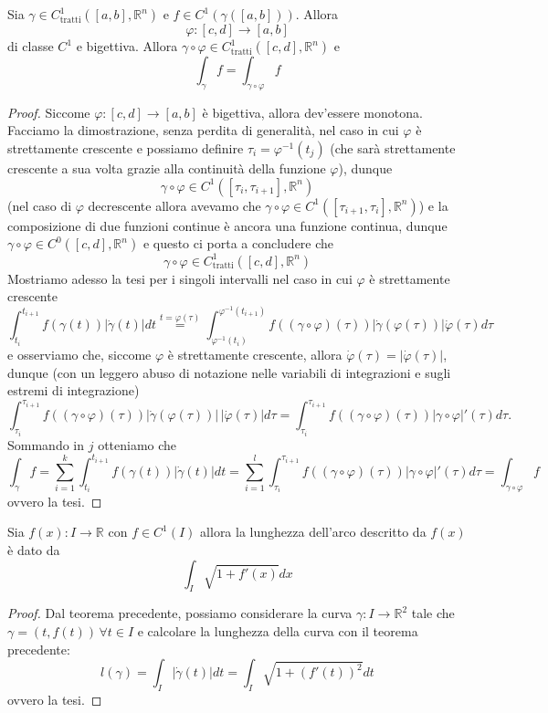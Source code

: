 \begin{theorem}
	Sia $\gamma \in C^1_{\text{tratti}}([a, b], \mathbb{R}^n)$ e $f \in C^1(\gamma([a, b]))$. Allora 
	$$
		\varphi: [c, d] \to [a, b]
	$$
	di classe $C^1$ e bigettiva. Allora $\gamma \circ \varphi \in C^1_{\text{tratti}}([c,d], \mathbb{R}^n)$ e
	$$
		\int_{\gamma} f = \int_{\gamma \circ \varphi} f
	$$
\end{theorem}
\begin{proof}
Siccome $\varphi: [c,d] \to [a,b]$ è bigettiva, allora dev'essere monotona. Facciamo la dimostrazione, senza perdita di generalità, nel caso in cui $\varphi$ è strettamente crescente
e possiamo definire $\tau_i = \varphi^{-1}(t_j)$ (che sarà strettamente crescente a sua volta grazie alla continuità della funzione $\varphi$), dunque
$$
\gamma \circ \varphi \in C^1([\tau_i, \tau_{i+1}], \mathbb{R}^n)
$$
(nel caso di $\varphi$ decrescente allora avevamo che $\gamma \circ \varphi \in C^1([\tau_{i+1}, \tau_{i}], \mathbb{R}^n)$) e la composizione di due funzioni continue è ancora una funzione continua, dunque
$\gamma \circ \varphi \in C^{0}([c, d], \mathbb{R}^n)$ e questo ci porta a concludere che
$$
\gamma \circ \varphi \in C^1_{\text{tratti}}([c, d], \mathbb{R}^n)
$$
Mostriamo adesso la tesi per i singoli intervalli nel caso in cui $\varphi$ è strettamente crescente
$$
\int_{t_i}^{t_{i+1}} f(\gamma(t))|\dot{\gamma}(t)|dt \stackrel{t = \varphi(\tau)}{=} \int_{\varphi^{-1}(t_{i})}^{\varphi^{-1}(t_{i+1})} f((\gamma \circ \varphi)(\tau))|\dot{\gamma}(\varphi(\tau))|\dot{\varphi}(\tau) d\tau
$$
\noindent e osserviamo che, siccome $\varphi$ è strettamente crescente, allora $\dot{\varphi}(\tau) = |\dot{\varphi}(\tau)|$, dunque (con un leggero abuso di notazione nelle variabili di integrazioni e sugli estremi di integrazione)
$$
\int_{\tau_i}^{\tau_{i+1}} f((\gamma \circ \varphi)(\tau))|\dot{\gamma}(\varphi(\tau))| \, |\dot{\varphi}(\tau)| d\tau = \int_{\tau_i}^{\tau_{i+1}} f( (\gamma \circ \varphi)(\tau) ) |\gamma \circ \varphi|'(\tau) d\tau.
$$
Sommando in $j$ otteniamo che
$$
\int_\gamma f = \sum_{i=1}^k \int_{t_i}^{t_{i+1}} f(\gamma(t))|\dot{\gamma}(t)|dt = \sum_{i=1}^l \int_{\tau_i}^{\tau_{i+1}} f((\gamma \circ \varphi)(\tau)) |\gamma \circ \varphi|'(\tau) d\tau = \int_{\gamma \circ \varphi} f 
$$
ovvero la tesi.
\end{proof}
\begin{cor}
	Sia $f(x): I \to \mathbb{R}$ con $f \in C^1(I)$ allora la lunghezza dell'arco descritto da $f(x)$ è dato da
	$$
		\int_I \sqrt{1 + f'(x)}dx
	$$
\end{cor}
\begin{proof}
Dal teorema precedente, possiamo considerare la curva $\gamma: I \to \mathbb{R}^2$ tale che $\gamma = (t, f(t)) \, \forall t \in I$ e calcolare la lunghezza della curva con il teorema precedente:
$$
	\mathit{l}(\gamma) = \int_{I} |\dot{\gamma}(t)|dt = \int_I \sqrt{1 + (f'(t))^2} dt
$$
ovvero la tesi.
\end{proof}
